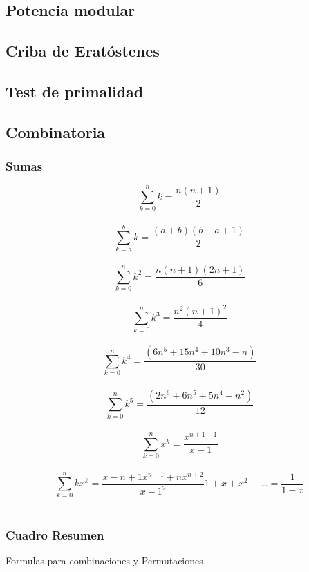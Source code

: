 \documentclass[10pt,letterpaper,twocolumn,twosided]{article}
\newcommand{\codigofuente}[1]{

\dotfill
}
\begin{document}
\subsection{Potencia modular}

\codigofuente{src/mate/mod_pow.cpp}

\subsection{Criba de Eratóstenes}

\codigofuente{src/mate/sieve.cpp}

\subsection{Test de primalidad}

\codigofuente{src/mate/rabin.cpp}


\subsection{Combinatoria}

\subsubsection{Sumas}


$$\sum_{k=0}^{n} k = \frac{n(n + 1)}{2}  $$\\ $$ \sum_{k=a}^{b} k = \frac{(a + b)(b - a + 1)}{2} $$ \\
$$ \sum_{k=0}^{n} k^2 = \frac{n(n + 1)(2n + 1)}{6} $$ \\ $$ \sum_{k=0}^{n} k^3 = \frac{n^{2}(n + 1)^{2}}{4} $$ \\
$$ \sum_{k=0}^{n} k^4 = \frac{(6n^5 + 15n^4 + 10n^3 - n)}{30} $$ \\ $$ \sum_{k=0}^{n} k^5 = \frac{(2n^6 + 6n^5 + 5n^4  - n^2)}{12} $$ \\
$$ \sum_{k=0}^{n} x^k = \frac{x^{n+1 - 1}}{x - 1} $$ \\

$$ \sum_{k=0}^{n} kx^k = \frac{{x - {n + 1}x^{n+1} + nx^{n+2}}}{{x - 1}^2 } 1 + x + x^2 + \dots = \frac{1}{{1 - x}} $$ \\


\subsubsection{Cuadro Resumen}
Formulas para combinaciones y Permutaciones
\end{document}
